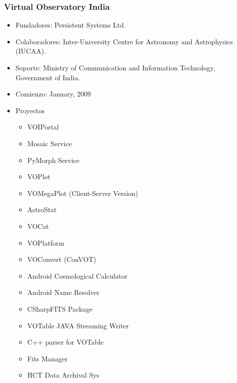 \subsubsection{Virtual Observatory India}
	\begin{itemize}
		\item Fundadores: Persistent Systems Ltd.
		\item Colaboradores: Inter-University Centre for Astronomy and Astrophysics (IUCAA).
		\item Soporte: Ministry of Communication and Information Technology, Government of India.
		\item Comienzo: January, 2009
		\item Proyectos
		\begin{itemize}
			\item VOIPortal
			\item Mosaic Service
			\item PyMorph Service
			\item VOPlot
			\item VOMegaPlot (Client-Server Version)
			\item AstroStat
			\item VOCat
			\item VOPlatform
			\item VOConvert (ConVOT)
			\item Android Cosmological Calculator
			\item Android Name Resolver
			\item CSharpFITS Package
			\item VOTable JAVA Streaming Writer
			\item C++ parser for VOTable
			\item Fits Manager
			\item HCT Data Archival Sys
		\end{itemize} 	
	\end{itemize}

